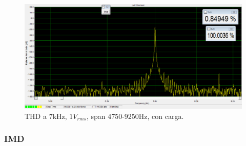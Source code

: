 \begin{figure}[H]
\centering
\includegraphics[width=\textwidth]{img/Distorsion/THD_7k_1V_carga_span_4750_9250.png}
\caption{THD a 7kHz, $1V_{rms}$, span 4750-9250Hz, con carga.}
\label{THD8} 
\end{figure}

\subsubsection*{IMD}